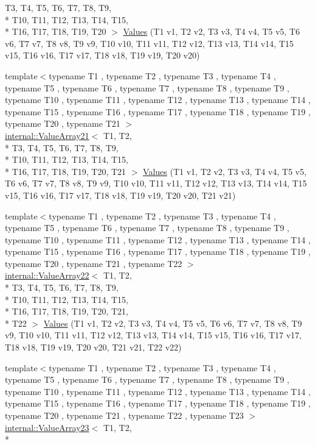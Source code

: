 \begin{DoxyCompactItemize}
T3, T4, T5, T6, T7, T8, T9, \\*
T10, T11, T12, T13, T14, T15, \\*
T16, T17, T18, T19, T20 $>$ \hyperlink{namespacetesting_aedd2f90dfb3c42dce713ba0b89cde96c}{Values} (T1 v1, T2 v2, T3 v3, T4 v4, T5 v5, T6 v6, T7 v7, T8 v8, T9 v9, T10 v10, T11 v11, T12 v12, T13 v13, T14 v14, T15 v15, T16 v16, T17 v17, T18 v18, T19 v19, T20 v20)
\item 
{\footnotesize template$<$typename T1 , typename T2 , typename T3 , typename T4 , typename T5 , typename T6 , typename T7 , typename T8 , typename T9 , typename T10 , typename T11 , typename T12 , typename T13 , typename T14 , typename T15 , typename T16 , typename T17 , typename T18 , typename T19 , typename T20 , typename T21 $>$ }\\\hyperlink{classtesting_1_1internal_1_1ValueArray21}{internal\-::\-Value\-Array21}$<$ T1, T2, \\*
T3, T4, T5, T6, T7, T8, T9, \\*
T10, T11, T12, T13, T14, T15, \\*
T16, T17, T18, T19, T20, T21 $>$ \hyperlink{namespacetesting_a6f3b9661b48f2c663dbe5fcfb0720f5f}{Values} (T1 v1, T2 v2, T3 v3, T4 v4, T5 v5, T6 v6, T7 v7, T8 v8, T9 v9, T10 v10, T11 v11, T12 v12, T13 v13, T14 v14, T15 v15, T16 v16, T17 v17, T18 v18, T19 v19, T20 v20, T21 v21)
\item 
{\footnotesize template$<$typename T1 , typename T2 , typename T3 , typename T4 , typename T5 , typename T6 , typename T7 , typename T8 , typename T9 , typename T10 , typename T11 , typename T12 , typename T13 , typename T14 , typename T15 , typename T16 , typename T17 , typename T18 , typename T19 , typename T20 , typename T21 , typename T22 $>$ }\\\hyperlink{classtesting_1_1internal_1_1ValueArray22}{internal\-::\-Value\-Array22}$<$ T1, T2, \\*
T3, T4, T5, T6, T7, T8, T9, \\*
T10, T11, T12, T13, T14, T15, \\*
T16, T17, T18, T19, T20, T21, \\*
T22 $>$ \hyperlink{namespacetesting_aadfff0d803156b98ff1ffa5f1d95c350}{Values} (T1 v1, T2 v2, T3 v3, T4 v4, T5 v5, T6 v6, T7 v7, T8 v8, T9 v9, T10 v10, T11 v11, T12 v12, T13 v13, T14 v14, T15 v15, T16 v16, T17 v17, T18 v18, T19 v19, T20 v20, T21 v21, T22 v22)
\item 
{\footnotesize template$<$typename T1 , typename T2 , typename T3 , typename T4 , typename T5 , typename T6 , typename T7 , typename T8 , typename T9 , typename T10 , typename T11 , typename T12 , typename T13 , typename T14 , typename T15 , typename T16 , typename T17 , typename T18 , typename T19 , typename T20 , typename T21 , typename T22 , typename T23 $>$ }\\\hyperlink{classtesting_1_1internal_1_1ValueArray23}{internal\-::\-Value\-Array23}$<$ T1, T2, \\*

\end{DoxyCompactItemize}
